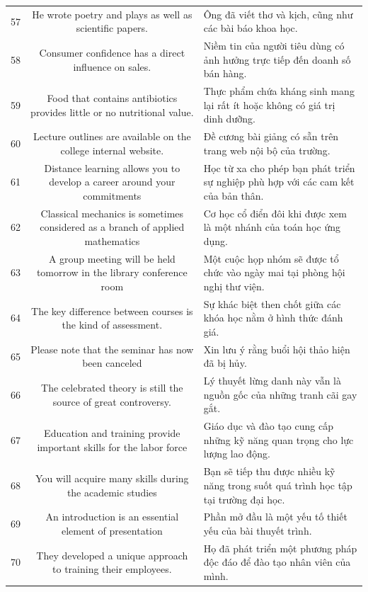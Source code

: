 \documentclass[11pt,a4paper]{article}
\begin{document}
\begin{longtable}{N S M}
57 & He wrote poetry and plays as well as scientific papers. & Ông đã viết thơ và kịch, cũng như các bài báo khoa học. \\
58 & Consumer confidence has a direct influence on sales. & Niềm tin của người tiêu dùng có ảnh hưởng trực tiếp đến doanh số bán hàng. \\
59 & Food that contains antibiotics provides little or no nutritional value. & Thực phẩm chứa kháng sinh mang lại rất ít hoặc không có giá trị dinh dưỡng. \\
60 & Lecture outlines are available on the college internal website. & Đề cương bài giảng có sẵn trên trang web nội bộ của trường. \\
61 & Distance learning allows you to develop a career around your commitments & Học từ xa cho phép bạn phát triển sự nghiệp phù hợp với các cam kết của bản thân. \\
62 & Classical mechanics is sometimes considered as a branch of applied mathematics & Cơ học cổ điển đôi khi được xem là một nhánh của toán học ứng dụng. \\
63 & A group meeting will be held tomorrow in the library conference room & Một cuộc họp nhóm sẽ được tổ chức vào ngày mai tại phòng hội nghị thư viện. \\
64 & The key difference between courses is the kind of assessment. & Sự khác biệt then chốt giữa các khóa học nằm ở hình thức đánh giá. \\
65 & Please note that the seminar has now been canceled & Xin lưu ý rằng buổi hội thảo hiện đã bị hủy. \\
66 & The celebrated theory is still the source of great controversy. & Lý thuyết lừng danh này vẫn là nguồn gốc của những tranh cãi gay gắt. \\
67 & Education and training provide important skills for the labor force & Giáo dục và đào tạo cung cấp những kỹ năng quan trọng cho lực lượng lao động. \\
68 & You will acquire many skills during the academic studies & Bạn sẽ tiếp thu được nhiều kỹ năng trong suốt quá trình học tập tại trường đại học. \\
69 & An introduction is an essential element of presentation & Phần mở đầu là một yếu tố thiết yếu của bài thuyết trình. \\
70 & They developed a unique approach to training their employees. & Họ đã phát triển một phương pháp độc đáo để đào tạo nhân viên của mình. \\

\end{longtable}
\end{document}
